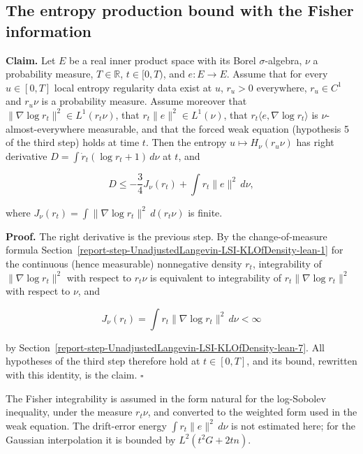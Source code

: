 \documentclass[11pt,a4paper]{report}
\begin{document}
\subsection{\texorpdfstring{The entropy production bound with the Fisher information}{The entropy production bound with the Fisher information}}
\label{report-step-UnadjustedLangevin-LSI-Regularity-lean-7}


\textbf{Claim.} Let \(E\) be a real inner product space with its Borel \(\sigma\)-algebra, \(\nu\) a probability measure, \(T\in\mathbb R\), \(t\in[0,T)\), and \(e:E\to E\). Assume that for every \(u\in[0,T]\) local entropy regularity data exist at \(u\), \(r_u>0\) everywhere, \(r_u\in C^1\) and \(r_u\nu\) is a probability measure. Assume moreover that \(\|\nabla\log r_t\|^2\in L^1(r_t\nu)\), that \(r_t\|e\|^2\in L^1(\nu)\), that \(r_t\langle e,\nabla\log r_t\rangle\) is \(\nu\)-almost-everywhere measurable, and that the forced weak equation (hypothesis 5 of the third step) holds at time \(t\). Then the entropy \(u\mapsto H_\nu(r_u\nu)\) has right derivative \(D=\int\dot r_t(\log r_t+1)\,d\nu\) at \(t\), and


\[D\le-\frac34J_\nu(r_t)+\int r_t\|e\|^2\,d\nu,\]


where \(J_\nu(r_t)=\int\|\nabla\log r_t\|^2\,d(r_t\nu)\) is finite.




\textbf{Proof.} The right derivative is the previous step. By the change-of-measure formula Section~\ref{report-step-UnadjustedLangevin-LSI-KLOfDensity-lean-1} for the continuous (hence measurable) nonnegative density \(r_t\), integrability of \(\|\nabla\log r_t\|^2\) with respect to \(r_t\nu\) is equivalent to integrability of \(r_t\|\nabla\log r_t\|^2\) with respect to \(\nu\), and


\[J_\nu(r_t)=\int r_t\|\nabla\log r_t\|^2\,d\nu<\infty\]


by Section~\ref{report-step-UnadjustedLangevin-LSI-KLOfDensity-lean-7}. All hypotheses of the third step therefore hold at \(t\in[0,T]\), and its bound, rewritten with this identity, is the claim. \(\square\)




The Fisher integrability is assumed in the form natural for the log-Sobolev inequality, under the measure \(r_t\nu\), and converted to the weighted form used in the weak equation. The drift-error energy \(\int r_t\|e\|^2\,d\nu\) is not estimated here; for the Gaussian interpolation it is bounded by \(L^2(t^2G+2tn)\).
\end{document}
